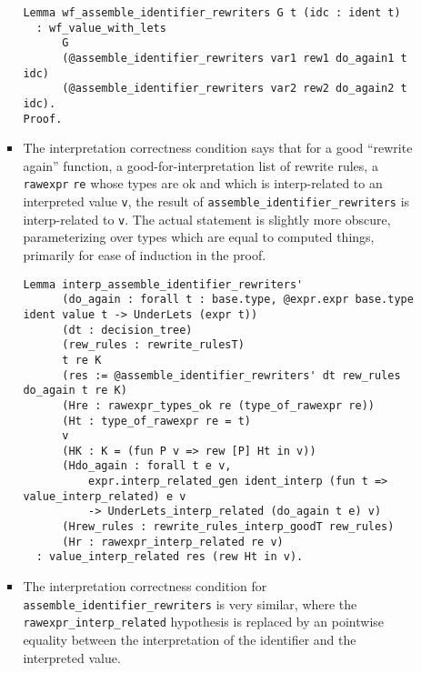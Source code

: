 \documentclass[
]{article}
\begin{document}
\begin{itemize}
\begin{itemize}
\begin{itemize}
\begin{verbatim}
Lemma wf_assemble_identifier_rewriters G t (idc : ident t)
  : wf_value_with_lets
      G
      (@assemble_identifier_rewriters var1 rew1 do_again1 t idc)
      (@assemble_identifier_rewriters var2 rew2 do_again2 t idc).
Proof.
\end{verbatim}
    \item
      The interpretation correctness condition says that for a good
      ``rewrite again'' function, a good-for-interpretation list of
      rewrite rules, a \texttt{rawexpr} \texttt{re} whose types are ok
      and which is interp-related to an interpreted value \texttt{v},
      the result of
      \texttt{assemble\_identifier\_rewriters\textquotesingle{}} is
      interp-related to \texttt{v}. The actual statement is slightly
      more obscure, parameterizing over types which are equal to
      computed things, primarily for ease of induction in the proof.

\begin{verbatim}
Lemma interp_assemble_identifier_rewriters'
      (do_again : forall t : base.type, @expr.expr base.type ident value t -> UnderLets (expr t))
      (dt : decision_tree)
      (rew_rules : rewrite_rulesT)
      t re K
      (res := @assemble_identifier_rewriters' dt rew_rules do_again t re K)
      (Hre : rawexpr_types_ok re (type_of_rawexpr re))
      (Ht : type_of_rawexpr re = t)
      v
      (HK : K = (fun P v => rew [P] Ht in v))
      (Hdo_again : forall t e v,
          expr.interp_related_gen ident_interp (fun t => value_interp_related) e v
          -> UnderLets_interp_related (do_again t e) v)
      (Hrew_rules : rewrite_rules_interp_goodT rew_rules)
      (Hr : rawexpr_interp_related re v)
  : value_interp_related res (rew Ht in v).
\end{verbatim}
    \item
      The interpretation correctness condition for
      \texttt{assemble\_identifier\_rewriters} is very similar, where
      the \texttt{rawexpr\_interp\_related} hypothesis is replaced by an
      pointwise equality between the interpretation of the identifier
      and the interpreted value.


\end{itemize}
\end{itemize}
\end{itemize}
\end{document}

